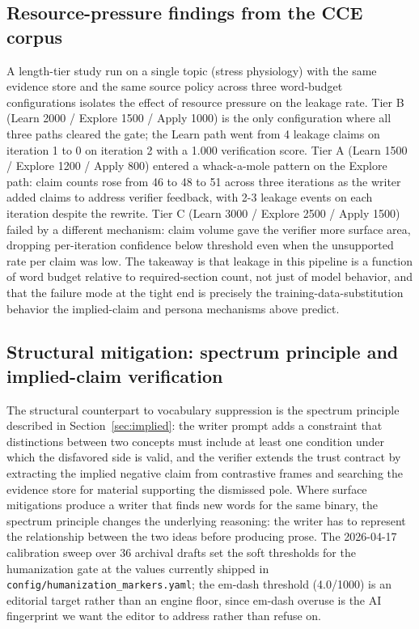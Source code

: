 \documentclass[11pt]{article}
\begin{document}
\subsection{Resource-pressure findings from the CCE corpus}

A length-tier study run on a single topic (stress physiology) with the
same evidence store and the same source policy across three word-budget
configurations isolates the effect of resource pressure on the leakage
rate. Tier B (Learn 2000 / Explore 1500 / Apply 1000) is the only
configuration where all three paths cleared the gate; the Learn path
went from 4 leakage claims on iteration 1 to 0 on iteration 2 with a
1.000 verification score. Tier A (Learn 1500 / Explore 1200 /
Apply 800) entered a whack-a-mole pattern on the Explore path: claim
counts rose from 46 to 48 to 51 across three iterations as the writer
added claims to address verifier feedback, with 2-3 leakage events on
each iteration despite the rewrite. Tier C (Learn 3000 / Explore 2500 /
Apply 1500) failed by a different mechanism: claim volume gave the
verifier more surface area, dropping per-iteration confidence below
threshold even when the unsupported rate per claim was low. The
takeaway is that leakage in this pipeline is a function of word budget
relative to required-section count, not just of model behavior, and
that the failure mode at the tight end is precisely the
training-data-substitution behavior the implied-claim and persona
mechanisms above predict.

\subsection{Structural mitigation: spectrum principle and implied-claim
verification}

The structural counterpart to vocabulary suppression is the spectrum
principle described in Section~\ref{sec:implied}: the writer prompt
adds a constraint that distinctions between two concepts must include
at least one condition under which the disfavored side is valid, and
the verifier extends the trust contract by extracting the implied
negative claim from contrastive frames and searching the evidence store
for material supporting the dismissed pole. Where surface mitigations
produce a writer that finds new words for the same binary, the spectrum
principle changes the underlying reasoning: the writer has to represent
the relationship between the two ideas before producing prose. The
2026-04-17 calibration sweep over 36 archival drafts set the soft
thresholds for the humanization gate at the values currently shipped in
\texttt{config/humanization\_markers.yaml}; the em-dash threshold
(4.0/1000) is an editorial target rather than an engine floor, since
em-dash overuse is the AI fingerprint we want the editor to address
rather than refuse on.
\end{document}
